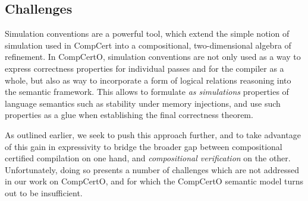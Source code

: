 %
%


\subsection{Challenges} %

Simulation conventions are a powerful tool,
which extend the simple notion of simulation used in CompCert
into a compositional, two-dimensional algebra of refinement.
In CompCertO,
simulation conventions are
not only used as a way to express correctness properties for
individual passes and for the compiler as a whole,
but also as way to incorporate a form of logical relations reasoning
into the semantic framework.
This allows to formulate \emph{as simulations}
properties of language semantics such as
stability under memory injections,
and use such properties as a glue
when establishing the final correctness theorem.

As outlined earlier,
we seek to push this approach further,
and to take advantage of this gain in expressivity
to bridge the broader gap between
compositional certified compilation on one hand, and
\emph{compositional verification} on the other.
Unfortunately,
doing so presents a number of challenges
which are not addressed in our work on CompCertO,
and for which the CompCertO semantic model
turns out to be insufficient.

